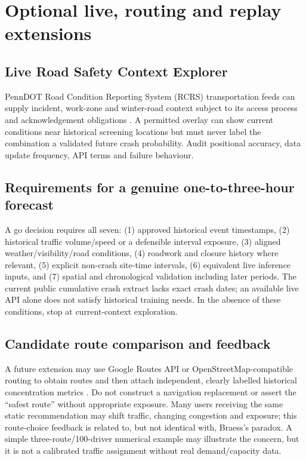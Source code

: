 \documentclass[11pt,a4paper,openany]{report}
\begin{document}
\chapter{Optional live, routing and replay extensions}
\section{Live Road Safety Context Explorer}
PennDOT Road Condition Reporting System (RCRS) transportation feeds can supply incident, work-zone and winter-road context subject to its access process and acknowledgement obligations \cite{RCRS}. A permitted overlay can show current conditions near historical screening locations but must never label the combination a validated future crash probability. Audit positional accuracy, data update frequency, API terms and failure behaviour.

\section{Requirements for a genuine one-to-three-hour forecast}
A go decision requires all seven: (1) approved historical event timestamps, (2) historical traffic volume/speed or a defensible interval exposure, (3) aligned weather/visibility/road conditions, (4) roadwork and closure history where relevant, (5) explicit non-crash site-time intervals, (6) equivalent live inference inputs, and (7) spatial and chronological validation including later periods. The current public cumulative crash extract lacks exact crash dates; an available live API alone does not satisfy historical training needs. In the absence of these conditions, stop at current-context exploration.

\section{Candidate route comparison and feedback}
A future extension may use Google Routes API or OpenStreetMap-compatible routing to obtain routes and then attach independent, clearly labelled historical concentration metrics \cite{GoogleRoutes}. Do not construct a navigation replacement or assert the ``safest route'' without appropriate exposure. Many users receiving the same static recommendation may shift traffic, changing congestion and exposure; this route-choice feedback is related to, but not identical with, Braess's paradox. A simple three-route/100-driver numerical example may illustrate the concern, but it is not a calibrated traffic assignment without real demand/capacity data.
\end{document}
